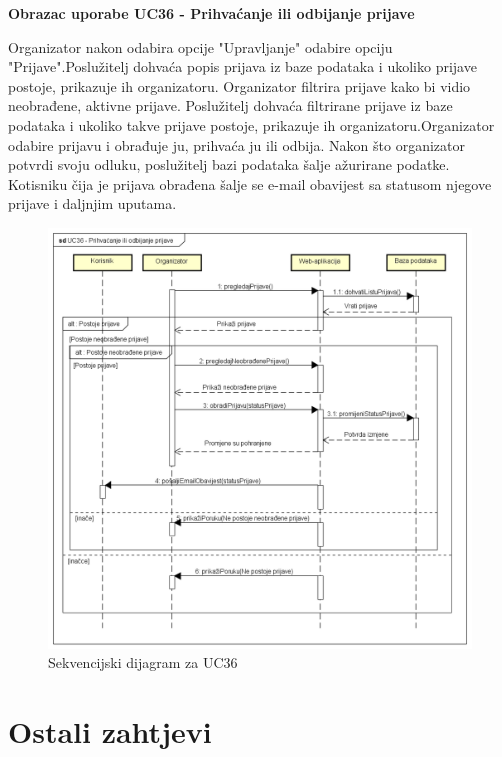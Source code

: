 				\textbf{Obrazac uporabe UC36 - Prihvaćanje ili odbijanje prijave}
				
				
				\noindent Organizator nakon odabira opcije "Upravljanje" odabire opciju "Prijave".Poslužitelj dohvaća popis prijava iz baze podataka i ukoliko prijave postoje, prikazuje ih organizatoru. Organizator filtrira prijave kako bi vidio neobrađene, aktivne prijave. Poslužitelj dohvaća filtrirane prijave iz baze podataka i ukoliko takve prijave postoje, prikazuje ih organizatoru.Organizator odabire prijavu i obrađuje ju, prihvaća ju ili odbija. Nakon što organizator potvrdi svoju odluku, poslužitelj bazi podataka šalje ažurirane podatke. Kotisniku čija je prijava obrađena šalje se e-mail obavijest sa statusom njegove prijave i daljnjim uputama.
				\begin{figure}[H]
					\centerline{\includegraphics[width=\linewidth]{slike/Sekvencijski_dijagram_UC36.png}}
					\caption{Sekvencijski dijagram za UC36}
					\label{fig:sekvencijskiUC36}
				\end{figure}
				\eject
				
			
			
				
				
	
		\section{Ostali zahtjevi}
			 
